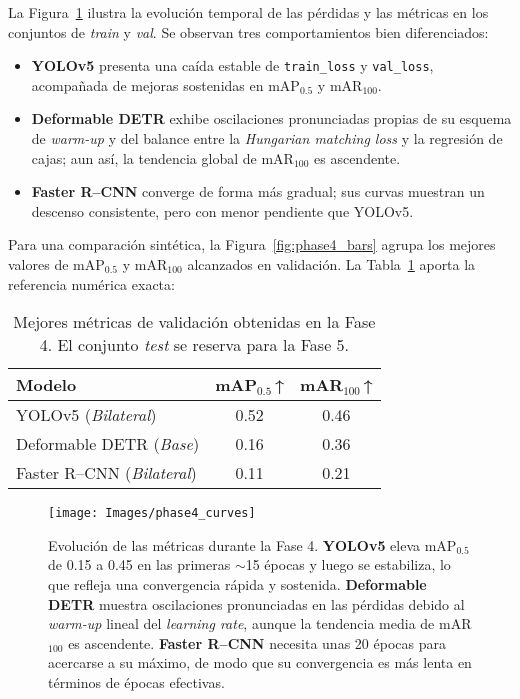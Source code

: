 La Figura~\ref{fig:phase4_curves} ilustra la evolución temporal de las pérdidas y las métricas en los conjuntos de \textit{train} y \textit{val}.
Se observan tres comportamientos bien diferenciados:

\begin{itemize}
  \item \textbf{YOLOv5} presenta una caída estable de \texttt{train\_loss} y \texttt{val\_loss}, acompañada de mejoras sostenidas en mAP\(_{0.5}\) y mAR\(_{100}\).
  \item \textbf{Deformable DETR} exhibe oscilaciones pronunciadas propias de su esquema de \emph{warm-up} y del balance entre la \emph{Hungarian matching loss} y la regresión de cajas; aun así, la tendencia global de mAR\(_{100}\) es ascendente.
  \item \textbf{Faster R–CNN} converge de forma más gradual; sus curvas muestran un descenso consistente, pero con menor pendiente que YOLOv5.
\end{itemize}

Para una comparación sintética, la Figura~\ref{fig:phase4_bars} agrupa los mejores valores de mAP\(_{0.5}\) y mAR\(_{100}\) alcanzados en validación.
La Tabla~\ref{tab:phase4_val} aporta la referencia numérica exacta:

\begin{table}[!ht]
  \centering
  \caption{Mejores métricas de validación obtenidas en la Fase 4.
           El conjunto \textit{test} se reserva para la Fase 5.}
  \label{tab:phase4_val}
  \begin{tabular}{lcc}
    \hline
    Modelo & mAP\(_{0.5}\)\,↑ & mAR\(_{100}\)\,↑\\
    \hline
    YOLOv5 (\textit{Bilateral})        & 0.52 & 0.46\\
    Deformable DETR (\textit{Base})    & 0.16 & 0.36\\
    Faster R--CNN (\textit{Bilateral}) & 0.11 & 0.21\\
    \hline
  \end{tabular}
\end{table}

\begin{figure}[!ht]
  \centering
  \texttt{[image: Images/phase4\_curves]}
  \caption{Evolución de las métricas durante la Fase 4.
           \textbf{YOLOv5} eleva mAP\(_{0.5}\) de 0.15 a 0.45 en las primeras
           $\sim$15 épocas y luego se estabiliza, lo que refleja una
           convergencia rápida y sostenida.
           \textbf{Deformable DETR} muestra oscilaciones pronunciadas en las
           pérdidas debido al \emph{warm-up} lineal del \emph{learning rate}\footnotemark,
           aunque la tendencia media de mAR\(_{100}\) es ascendente.
           \textbf{Faster R–CNN} necesita unas 20 épocas para acercarse a su
           máximo, de modo que su convergencia es más lenta en términos de
           épocas efectivas.}
  \label{fig:phase4_curves}
\end{figure}

